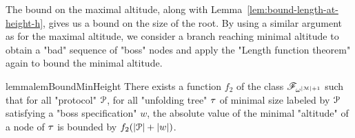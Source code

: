 The bound on the maximal altitude, along with Lemma~\ref{lem:bound-length-at-height-h}, gives us a bound on the size of the root. 
By using a similar argument as for the maximal altitude, we consider a branch reaching minimal altitude to obtain a "bad" sequence of "boss" nodes and apply the "Length function theorem" again to bound the minimal altitude.



\begin{restatable}{lemma}{lemBoundMinHeight}
	\label{lem:bound-min-height}
	There exists a function $f_2$ of the class $\mathscr{F}_{\omega^{|\mathcal{M}|+1}}$ such that for all "protocol" $\mathcal{P}$, for all "unfolding tree" $\tau$ of minimal size labeled by $\mathcal{P}$ satisfying a "boss specification" $w$, the absolute value of the minimal "altitude" of a node of $\tau$ is bounded by $f_2(|\mathcal{P}| + |w|)$.
\end{restatable}

